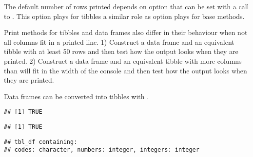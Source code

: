 \documentclass[krantz2]{krantz}\usepackage{knitr}
\begin{document}
\begin{explainbox}
The default number of rows printed depends on \Rlang option  that can be set with a call to . This option plays for tibbles a similar role as option  plays for base \Rlang {} methods.

\begin{knitrout}\footnotesize
{}\color{fgcolor}\begin{kframe}
\begin{alltt}
\hlstd{(} \hlstd{=} \hlstd{,}  \hlstd{=} \hlstd{)}
\end{alltt}
\end{kframe}
\end{knitrout}
\end{explainbox}

\begin{playground}
Print methods for tibbles and data frames also differ in their behaviour when not all columns fit in a printed line. 1) Construct a data frame and an equivalent tibble with at least 50 rows and then test how the output looks when they are printed. 2) Construct a data frame and an equivalent tibble with more columns than will fit in the width of the \Rlang console and then test how the output looks when they are printed.
\end{playground}

Data frames can be converted into tibbles with .

\begin{knitrout}\footnotesize
{}\color{fgcolor}\begin{kframe}
\begin{alltt}
 \hlkwb{<-} 
\end{alltt}
\begin{verbatim}
## [1] TRUE
\end{verbatim}
\begin{alltt}
\end{alltt}
\begin{verbatim}
## [1] TRUE
\end{verbatim}
\begin{alltt}
\end{alltt}
\begin{verbatim}
## tbl_df containing:
## codes: character, numbers: integer, integers: integer
\end{verbatim}
\end{kframe}
\end{knitrout}
\end{document}
